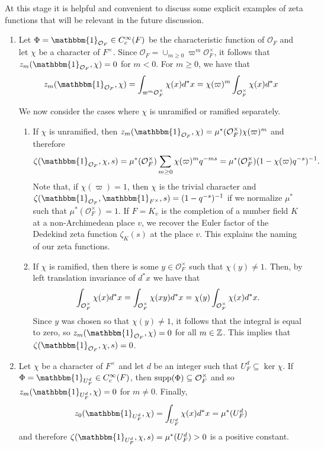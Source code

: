 \begin{example}\label{example:zetafnc}
    At this stage it is helpful and convenient to discuss some explicit examples of zeta functions that will be relevant in the future discussion.
    \begin{enumerate}[(1)]
        \item Let $\Phi=\mathbbm{1}_{\mathcal{O}_F}\in C_c^\infty(F)$ be the characteristic function of $\mathcal{O}_F$ and let $\chi$ be a character of $F^\times$. Since $\mathcal{O}_F=\cup_{m\geq0}\varpi^m\mathcal{O}_F^\times$, it follows that $z_m(\mathbbm{1}_{\mathcal{O}_F},\chi)=0$ for $m<0$. For $m\geq 0$, we have that 
        $$z_m(\mathbbm{1}_{\mathcal{O}_F},\chi)=\int_{\varpi^m \mathcal O_F^\times} \chi(x)d^*x=\chi(\varpi)^m\int_{\mathcal{O}_F^\times}\chi(x)d^*x$$
        
        We now consider the cases where $\chi$ is unramified or ramified separately.
        \begin{enumerate}
            \item If $\chi$ is unramified, then $z_m(\mathbbm{1}_{\mathcal{O}_F},\chi)=\mu^*(\mathcal{O}_F^\times)\chi(\varpi)^m$
            and therefore $$\zeta(\mathbbm{1}_{\mathcal{O}_F},\chi,s)=\mu^*(\mathcal{O}_F^\times)\sum_{m\geq0}\chi(\varpi)^mq^{-ms}=\mu^*(\mathcal{O}_F^\times)(1-\chi(\varpi)q^{-s})^{-1}.$$
            Note that, if $\chi(\varpi)=1$, then $\chi$ is the trivial character and $\zeta(\mathbbm{1}_{\mathcal{O}_F},\mathbbm{1}_{F^\times},s)=(1-q^{-s})^{-1}$ if we normalize $\mu^*$ such that $\mu^*(\mathcal{O}_F^\times)=1$. If $F=K_v$ is the completion of a number field $K$ at a non-Archimedean place $v$, we recover the Euler factor of the Dedekind zeta function $\zeta_K(s)$ at the place $v$. This explains the naming of our zeta functions. 
            \item If $\chi$ is ramified, then there is some $y\in\mathcal{O}_F^\times$ such that $\chi(y)\neq 1$. Then, by left translation invariance of $d^*x$ we have that
            $$\int_{\mathcal O_F^\times} \chi(x)d^*x = \int_{\mathcal O_F^\times} \chi(xy)d^*x = \chi(y)\int_{\mathcal{O}_F^\times} \chi(x) d^*x.$$
            Since $y$ was chosen so that $\chi(y)\neq 1$, it follows that 
            the integral is equal to zero, so $z_m(\mathbbm{1}_{\mathcal{O}_F},\chi)=0$ for all $m\in\mathbb{Z}$. This implies that $\zeta(\mathbbm{1}_{\mathcal{O}_F},\chi,s)=0$.
        \end{enumerate}

        \item Let $\chi$ be a character of $F^\times$ and let $d$ be an integer such that $U_F^d\subseteq\ker\chi$. If $\Phi=\mathbbm{1}_{U_F^d}\in C_c^\infty(F)$, then $\mathrm{supp}(\Phi)\subseteq\mathcal{O}_F^\times$ and so $z_m(\mathbbm{1}_{U_F^d},\chi)=0$ for $m\neq0$. Finally, 
        $$z_0(\mathbbm{1}_{U_F^d},\chi)=\int_{U_F^d}\chi(x)d^*x=\mu^*(U_F^d)$$
        and therefore $\zeta(\mathbbm{1}_{U_F^d},\chi,s)=\mu^*(U_F^d)>0$ is a positive constant.       
    \end{enumerate}
\end{example}


